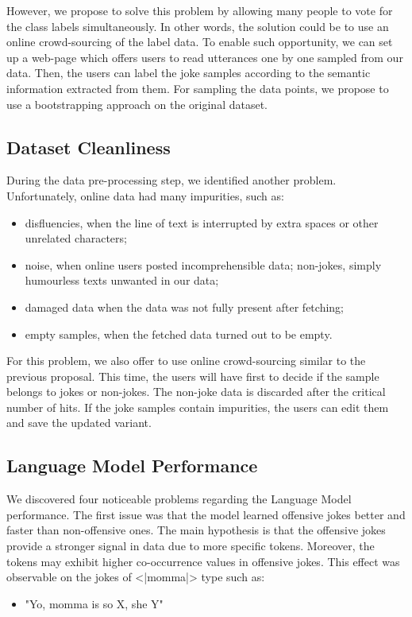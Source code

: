 However, we propose to solve this problem by allowing many people to vote for the class labels simultaneously. In other words, the solution could be to use an online crowd-sourcing of the label data. To enable such opportunity, we can set up a web-page which offers users to read utterances one by one sampled from our data. Then, the users can label the joke samples according to the semantic information extracted from them. For sampling the data points, we propose to use a bootstrapping approach on the original dataset.

\subsection{Dataset Cleanliness}\label{subsection:datac}

During the data pre-processing step, we identified another problem. Unfortunately, online data had many impurities, such as:    
\begin{itemize}
    \item disfluencies, when the line of text is interrupted by extra spaces or other unrelated characters;
    \item noise, when online users posted incomprehensible data; non-jokes, simply humourless texts unwanted in our data;
    \item damaged data when the data was not fully present after fetching;
    \item empty samples, when the fetched data turned out to be empty.
\end{itemize}

For this problem, we also offer to use online crowd-sourcing similar to the previous proposal. This time, the users will have first to decide if the sample belongs to jokes or non-jokes. The non-joke data is discarded after the critical number of hits. If the joke samples contain impurities, the users can edit them and save the updated variant.

\subsection{Language Model Performance}

We discovered four noticeable problems regarding the Language Model performance. The first issue was that the model learned offensive jokes better and faster than non-offensive ones. The main hypothesis is that the offensive jokes provide a stronger signal in data due to more specific tokens. Moreover, the tokens may exhibit higher co-occurrence values in offensive jokes. This effect was observable on the jokes of <|momma|> type such as:
\begin{itemize}
    \item "Yo, momma is so X, she Y"
\end{itemize}

